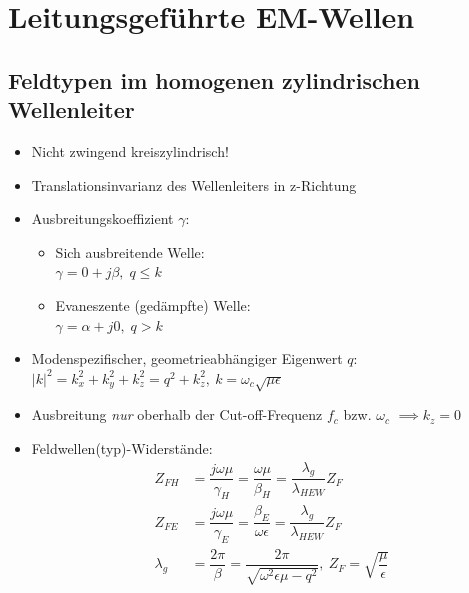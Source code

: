 \vspace{1cm}
\section{Leitungsgeführte EM-Wellen}
\subsection{Feldtypen im homogenen zylindrischen Wellenleiter}
\begin{itemize}
    \itemsep0pt
    \item Nicht zwingend kreiszylindrisch!
    \item Translationsinvarianz des Wellenleiters in z-Richtung
    \item Ausbreitungskoeffizient $\gamma$:
        \begin{itemize}
            \itemsep0pt
            \item Sich ausbreitende Welle:\\
                \(\gamma = 0 + j\beta,\; q \leq k\)
            \item Evaneszente (gedämpfte) Welle:\\
                \(\gamma = \alpha + j0,\; q > k\)
        \end{itemize}
    \item Modenspezifischer, geometrieabhängiger Eigenwert \(q\):\\
        \(|k|^2 = k_x^2 + k_y^2 + k_z^2 = q^2 + k_z^2,\: k = \omega_c \sqrt{\mu\epsilon}\)
    \item Ausbreitung \textit{nur} oberhalb der Cut-off-Frequenz \(f_c\) bzw. \(\omega_c\) \(\implies k_z = 0\)\\
    \item Feldwellen(typ)-Widerstände:
        \begin{align*}
            Z_{FH} &= \dfrac{j\omega\mu}{\gamma_H} = \dfrac{\omega\mu}{\beta_H} = \dfrac{\lambda_g}{\lambda_{HEW}}Z_{F}\\
            Z_{FE} &= \dfrac{j\omega\mu}{\gamma_E} = \dfrac{\beta_E}{\omega\epsilon} = \dfrac{\lambda_g}{\lambda_{HEW}}Z_{F}\\
            \lambda_g &= \dfrac{2\pi}{\beta} = \dfrac{2\pi}{\sqrt{\omega^2\epsilon\mu - q^2}},\
            Z_F = \sqrt{\dfrac{\mu}{\epsilon}}
        \end{align*}
\end{itemize}
